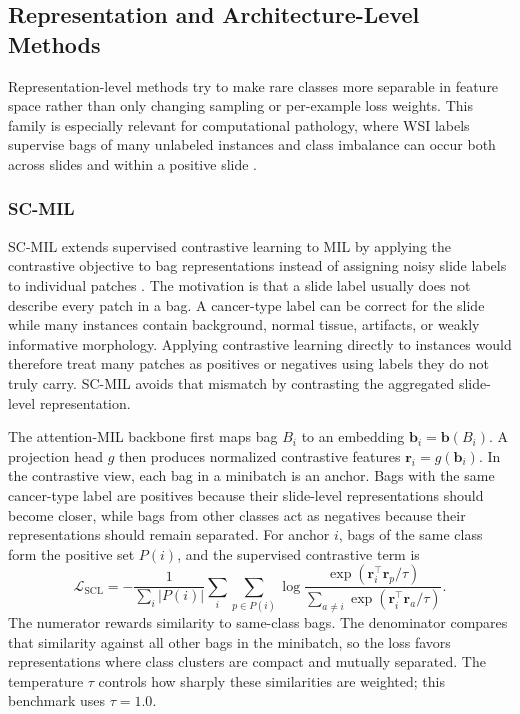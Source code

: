 \documentclass[11pt]{article}
\begin{document}
\subsection{Representation and Architecture-Level Methods}
Representation-level methods try to make rare classes more separable in feature space rather than only changing sampling or per-example loss weights. This family is especially relevant for computational pathology, where WSI labels supervise bags of many unlabeled instances and class imbalance can occur both across slides and within a positive slide \citep{juyal2024scMil}.

\subsubsection{SC-MIL}
SC-MIL extends supervised contrastive learning to MIL by applying the contrastive objective to bag representations instead of assigning noisy slide labels to individual patches \citep{juyal2024scMil}. The motivation is that a slide label usually does not describe every patch in a bag. A cancer-type label can be correct for the slide while many instances contain background, normal tissue, artifacts, or weakly informative morphology. Applying contrastive learning directly to instances would therefore treat many patches as positives or negatives using labels they do not truly carry. SC-MIL avoids that mismatch by contrasting the aggregated slide-level representation.

The attention-MIL backbone first maps bag $B_i$ to an embedding $\mathbf{b}_i=\mathbf{b}(B_i)$. A projection head $g$ then produces normalized contrastive features $\mathbf{r}_i=g(\mathbf{b}_i)$. In the contrastive view, each bag in a minibatch is an anchor. Bags with the same cancer-type label are positives because their slide-level representations should become closer, while bags from other classes act as negatives because their representations should remain separated. For anchor $i$, bags of the same class form the positive set $P(i)$, and the supervised contrastive term is
\begin{equation}
  \mathcal{L}_{\mathrm{SCL}} =
  -\frac{1}{\sum_i |P(i)|}
  \sum_i \sum_{p\in P(i)}
  \log
  \frac{\exp(\mathbf{r}_i^\top\mathbf{r}_p/\tau)}
       {\sum_{a\ne i}\exp(\mathbf{r}_i^\top\mathbf{r}_a/\tau)}.
  \label{eq:scl}
\end{equation}
\noindent The numerator rewards similarity to same-class bags. The denominator compares that similarity against all other bags in the minibatch, so the loss favors representations where class clusters are compact and mutually separated. The temperature $\tau$ controls how sharply these similarities are weighted; this benchmark uses $\tau=1.0$.
\end{document}
